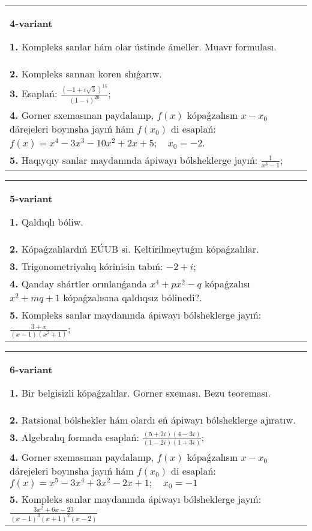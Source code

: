 \documentclass{article}
\begin{document}
\begin{tabular}{m{17cm}}
\textbf{4-variant}
\newline

\textbf{1.} Kompleks sanlar hám olar ústinde ámeller. Muavr formulası.  \\
\textbf{2.} Kompleks sannan koren shıǵarıw. \\
\textbf{3.} Esaplań:  $\frac{(-1+i \sqrt{3})^{15}}{(1-i)^{20}}$; \\
\textbf{4.} Gorner sxemasınan paydalanıp, $f(x)$ kópaǵzalısın $x-x_0$ dárejeleri boyınsha jayıń hám $f\left(x_0\right)$ di esaplań: $f(x)=x^4-3 x^3-10 x^2+2 x+5 ; \quad x_0=-2$. \\
\textbf{5.} Haqıyqıy sanlar maydanında ápiwayı bólsheklerge jayıń:  $\frac{1}{x^3-1}$; \\

\end{tabular}
\vspace{1cm}


\begin{tabular}{m{17cm}}
\textbf{5-variant}
\newline

\textbf{1.} Qaldıqlı bóliw.  \\
\textbf{2.} Kópaǵzalılardıń EÚUB si. Keltirilmeytuǵın   kópaǵzalılar. \\
\textbf{3.} Trigonometriyalıq kórinisin tabıń: $-2+i$; \\
\textbf{4.} Qanday shártler orınlanǵanda $x^4+p x^2-q$ kópaǵzalısı $x^2+m q+1$ kópaǵzalısına qaldıqsız bólinedi?. \\
\textbf{5.} Kompleks sanlar maydanında ápiwayı bólsheklerge jayıń: $\frac{3+x}{(x-1)\left(x^2+1\right)}$; \\

\end{tabular}
\vspace{1cm}


\begin{tabular}{m{17cm}}
\textbf{6-variant}
\newline

\textbf{1.} Bir belgisizli kópaǵzalılar. Gorner sxeması. Bezu teoreması.  \\
\textbf{2.} Ratsional bólshekler hám olardı eń ápiwayı bólsheklerge ajıratıw. \\
\textbf{3.} Algebralıq formada esaplań: $\frac{(5+2 i)(4-3 i)}{(1-2 i)(1+3 i)}$; \\
\textbf{4.} Gorner sxemasınan paydalanıp, $f(x)$ kópaǵzalısın $x-x_0$ dárejeleri boyınsha jayıń hám $f\left(x_0\right)$ di esaplań: $f(x)=x^5-3 x^4+3 x^2-2 x+1 ; \quad x_0=-1$ \\
\textbf{5.} Kompleks sanlar maydanında ápiwayı bólsheklerge jayıń: $\frac{3 x^2+6 x-23}{(x-1)^3(x+1)^2(x-2)}$ \\

\end{tabular}
\vspace{1cm}
\end{document}
